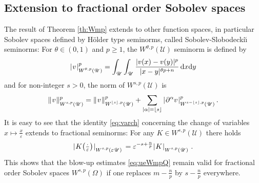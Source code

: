 \documentclass[titlepage,12pt]{amsart}
\theoremstyle{definition}
\theoremstyle{remark}
\numberwithin{equation}{section}
\newcommand{\ee}{\hskip0.15ex}
\newcommand{\dd}[1]{_{\raise-0.6ex\hbox{$\scriptstyle #1$}}}
\newcommand {\Norm}[2]{ \mathchoice
    {|\ee #1\ee|\dd{#2}\,}
    {| #1 |_{#2}}
    {| #1 |_{#2}}
    {| #1 |_{#2}} }
\newcommand {\Normc}[3]{ \mathchoice
    {|\ee #1\ee|\dd{#2}^{#3}}
    {| #1 |_{#2}^{#3}}
    {| #1 |_{#2}^{#3}}
    {| #1 |_{#2}^{#3}} }
\newcommand {\DNormc}[3]{ \mathchoice
    {\|\ee #1\ee\|\dd{#2}^{#3}}
    {\| #1 \|_{#2}^{#3}}
    {\| #1 \|_{#2}^{#3}}
    {\| #1 \|_{#2}^{#3}} }
\newcommand{\sU}{{\mathscr U}}
\newcommand{\rd}{{\mathrm d}}
\begin{document}
\subsection{Extension to fractional order Sobolev spaces}
\label{ss:SS}
The result of Theorem \ref{th:Wmp} extends to other function spaces, in particular Sobolev spaces defined by H\"older type seminorms, called Sobolev-Slobodecki\u{\i} seminorms: For $\theta\in(0,1)$ and $p\ge1$, the $W^{\theta,p}(\sU)$ seminorm is defined by
\[
   \Normc{v}{W^{\theta,p}(\sU)}{p} = 
   \int_\sU\int_\sU \frac{|v(x)-v(y)|^p}{|x-y|^{\theta p+n}}\,\rd x\rd y
\]
and for non-integer $s>0$, the norm of $W^{s,p}(\sU)$ is 
\[
   \DNormc{v}{W^{s,p}(\sU)}{p} = 
   \DNormc{v}{W^{\lfloor s \rfloor,p}(\sU)}{p} +
   \sum_{|\alpha|= \lfloor s \rfloor} \Normc{\partial^\alpha v}{W^{s-\lfloor s \rfloor,p}(\sU)}{p}\,.
\]
It is easy to see that the identity \eqref{eq:varch} concerning the change of variables $x\mapsto\frac{x}{\varepsilon}$ extends to fractional seminorms: For any $K\in W^{s,p}(\sU)$ there holds
\[
   \Norm{K\big(\tfrac{\cdot}{\varepsilon}\big)}{W^{s,p}(\varepsilon\sU)} =
   \varepsilon^{-s+\frac{n}{p}}
   \Norm{K}{W^{s,p}(\sU)}\,.
\]
This shows that the blow-up estimates \eqref{eq:ueWmpQ} remain valid for fractional order Sobolev spaces $W^{s,p}(\Omega)$ if one replaces $m-\frac{n}{p}$ by $s-\frac{n}{p}$ everywhere.
\end{document}
